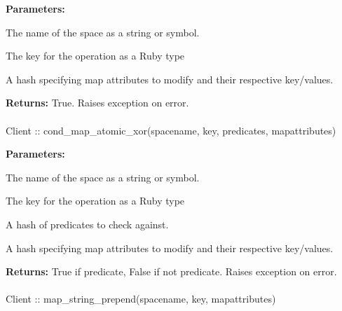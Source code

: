\noindent\textbf{Parameters:}
\begin{description}[labelindent=\widthof{{\code{mapattributes}}},leftmargin=*,noitemsep,nolistsep,align=right]
\item[\code{spacename}] The name of the space as a string or symbol.
\item[\code{key}] The key for the operation as a Ruby type
\item[\code{mapattributes}] A hash specifying map attributes to modify and their respective key/values.
\end{description}

\noindent\textbf{Returns:}
True.  Raises exception on error.

\paragraph{}
\label{api:ruby:cond_map_atomic_xor}
\begin{ccode}
Client :: cond_map_atomic_xor(spacename, key, predicates, mapattributes)
\end{ccode}
\funcdesc 

\noindent\textbf{Parameters:}
\begin{description}[labelindent=\widthof{{\code{mapattributes}}},leftmargin=*,noitemsep,nolistsep,align=right]
\item[\code{spacename}] The name of the space as a string or symbol.
\item[\code{key}] The key for the operation as a Ruby type
\item[\code{predicates}] A hash of predicates to check against.
\item[\code{mapattributes}] A hash specifying map attributes to modify and their respective key/values.
\end{description}

\noindent\textbf{Returns:}
True if predicate, False if not predicate.  Raises exception on error.

\paragraph{}
\label{api:ruby:map_string_prepend}
\begin{ccode}
Client :: map_string_prepend(spacename, key, mapattributes)
\end{ccode}
\funcdesc 

